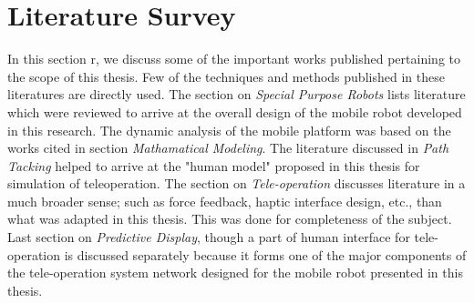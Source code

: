 \section{Literature Survey}
\label{sec_LitRev}
In this section r, we  discuss some of the important works published pertaining to the scope of this thesis. Few of the techniques and methods published in these literatures are directly used. The section on \textit{Special Purpose Robots} lists literature which were reviewed to arrive at the overall design of the mobile robot developed in this research.
The dynamic analysis of the mobile platform was based on the works cited in section\textit{ Mathamatical Modeling}. 
The literature discussed in \textit{Path Tacking } helped to arrive at the "human model" proposed in this thesis for simulation of teleoperation. 
The section on \textit{Tele-operation} discusses literature in a much broader sense; such as force feedback, haptic interface  design, etc., than what was adapted in this thesis. 
This was done for completeness of the subject. 
Last section on \textit{Predictive Display}, though a part of human interface for tele-operation is discussed separately because it forms one of the major components of the tele-operation system network designed  for the mobile robot  presented in this thesis.   
